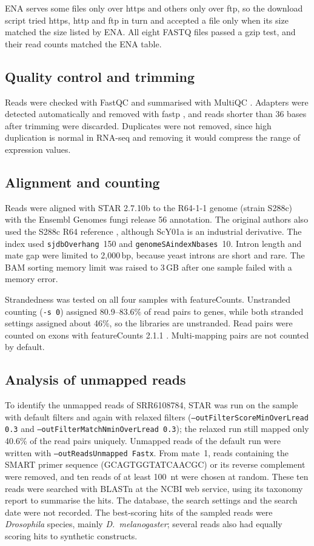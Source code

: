 \documentclass[11pt, a4paper]{article}
\begin{document}
ENA serves some files only over https and others only over ftp, so the download script tried https, http and ftp in turn and accepted a file only when its size matched the size listed by ENA. All eight FASTQ files passed a gzip test, and their read counts matched the ENA table.

\subsection{Quality control and trimming}
Reads were checked with FastQC \cite{andrews2010} and summarised with MultiQC \cite{ewels2016}. Adapters were detected automatically and removed with fastp \cite{chen2018}, and reads shorter than 36 bases after trimming were discarded. Duplicates were not removed, since high duplication is normal in RNA-seq and removing it would compress the range of expression values.

\subsection{Alignment and counting}
Reads were aligned with STAR 2.7.10b \cite{dobin2013} to the R64-1-1 genome (strain S288c) with the Ensembl Genomes fungi release 56 annotation. The original authors also used the S288c R64 reference \cite{gan2021}, although ScY01a is an industrial derivative. The index used \texttt{sjdbOverhang}~150 and \texttt{genomeSAindexNbases}~10. Intron length and mate gap were limited to 2,000\,bp, because yeast introns are short and rare. The BAM sorting memory limit was raised to 3\,GB after one sample failed with a memory error.

Strandedness was tested on all four samples with featureCounts. Unstranded counting (\texttt{-s~0}) assigned 80.9--83.6\% of read pairs to genes, while both stranded settings assigned about 46\%, so the libraries are unstranded. Read pairs were counted on exons with featureCounts 2.1.1 \cite{liao2014}. Multi-mapping pairs are not counted by default.

\subsection{Analysis of unmapped reads}
To identify the unmapped reads of SRR6108784, STAR was run on the sample with default filters and again with relaxed filters (\texttt{--outFilterScoreMinOverLread 0.3} and \texttt{--outFilterMatchNminOverLread 0.3}); the relaxed run still mapped only 40.6\% of the read pairs uniquely. Unmapped reads of the default run were written with \texttt{--outReadsUnmapped Fastx}. From mate~1, reads containing the SMART primer sequence (GCAGTGGTATCAACGC) or its reverse complement were removed, and ten reads of at least 100~nt were chosen at random. These ten reads were searched with BLASTn \cite{altschul1990} at the NCBI web service, using its taxonomy report to summarise the hits. The database, the search settings and the search date were not recorded. The best-scoring hits of the sampled reads were \textit{Drosophila} species, mainly \textit{D.~melanogaster}; several reads also had equally scoring hits to synthetic constructs.
\end{document}
